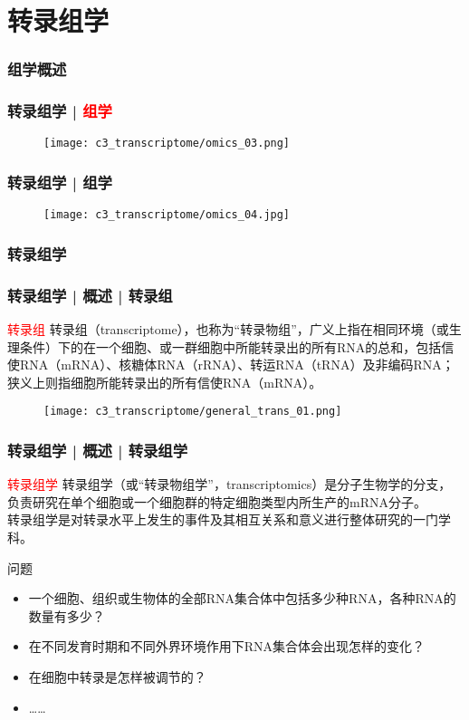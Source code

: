 \section{转录组学}

\subsubsection{组学概述}
\begin{frame}
  \frametitle{转录组学 | \textcolor{red}{组学}}
  \begin{figure}
    \centering
    \texttt{[image: c3\_transcriptome/omics\_03.png]}
  \end{figure}
\end{frame}

\begin{frame}
  \frametitle{转录组学 | 组学}
  \begin{figure}
    \centering
    \texttt{[image: c3\_transcriptome/omics\_04.jpg]}
  \end{figure}
\end{frame}

\subsubsection{转录组学}
\begin{frame}
  \frametitle{转录组学 | 概述 | 转录组}
  \begin{block}{\textcolor{red}{转录组}}
转录组（transcriptome），也称为“转录物组”，广义上指在相同环境（或生理条件）下的在一个细胞、或一群细胞中所能转录出的所有RNA的总和，包括信使RNA（mRNA）、核糖体RNA（rRNA）、转运RNA（tRNA）及非编码RNA；狭义上则指细胞所能转录出的所有信使RNA（mRNA）。
  \end{block}
  \begin{figure}
    \centering
    \texttt{[image: c3\_transcriptome/general\_trans\_01.png]}
  \end{figure}
\end{frame}

\begin{frame}
  \frametitle{转录组学 | 概述 | 转录组学}
  \begin{block}{\textcolor{red}{转录组学}}
转录组学（或“转录物组学”，transcriptomics）是分子生物学的分支，负责研究在单个细胞或一个细胞群的特定细胞类型内所生产的mRNA分子。\\
    \vspace{0.5em}
    转录组学是对转录水平上发生的事件及其相互关系和意义进行整体研究的一门学科。
  \end{block}
  \pause
  \begin{block}{问题}
    \begin{itemize}
      \item 一个细胞、组织或生物体的全部RNA集合体中包括多少种RNA，各种RNA的数量有多少？
      \item 在不同发育时期和不同外界环境作用下RNA集合体会出现怎样的变化？
      \item 在细胞中转录是怎样被调节的？
      \item ……
    \end{itemize}
  \end{block}
\end{frame}

